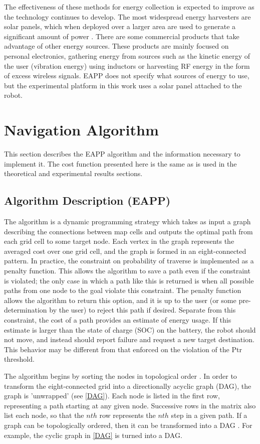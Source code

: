 \documentclass[journal]{IEEEtran}
\newcounter{row}
\newcounter{col}
\begin{document}
The effectiveness of these methods for energy collection is expected to improve as the technology continues to develop. 
The most widespread energy harvesters are solar panels, which when deployed over a larger area are used to generate a significant amount of power \cite{DoE citation here}. 
There are some commercial products that take advantage of other energy sources. 
These products are mainly focused on personal electronics, gathering energy from sources such as the kinetic energy of the user (vibration energy) using inductors or harvesting RF energy in the form of excess wireless signals. 
EAPP does not specify what sources of energy to use, but the experimental platform in this work uses a solar panel attached to the robot.

\section{Navigation Algorithm}
This section describes the EAPP algorithm and the information necessary to implement it. The cost function presented here is the same as is used in the theoretical and experimental results sections.

\subsection{Algorithm Description (EAPP)}
The algorithm is a dynamic programming strategy which takes as input a graph describing the connections between map cells and outputs the optimal path from each grid cell to some target node. 
Each vertex in the graph represents the averaged cost over one grid cell, and the graph is formed in an eight-connected pattern. 
In practice, the constraint on probability of traverse is implemented as a penalty function. 
This allows the algorithm to save a path even if the constraint is violated; the only case in which a path like this is returned is when all possible paths from one node to the goal violate this constraint. 
The penalty function allows the algorithm to return this option, and it is up to the user (or some pre-determination by the user) to reject this path if desired. 
Separate from this constraint, the cost of a path provides an estimate of energy usage. 
If this estimate is larger than the state of charge (SOC) on the battery, the robot should not move, and instead should report failure and request a new target destination. 
This behavior may be different from that enforced on the violation of the Ptr threshold.

The algorithm begins by sorting the nodes in topological order . 
In order to transform the eight-connected grid into a directionally acyclic graph (DAG), the graph is 'unwrapped' (see \ref{DAG}).
Each node is listed in the first row, representing a path starting at any given node. 
Successive rows in the matrix also list each node, so that the $nth$ row represents the $nth$ step in a given path. 
If a graph can be topologically ordered, then it can be transformed into a DAG \cite{vazirani algorithms ch. 6}. For example, the cyclic graph in \ref{DAG} is turned into a DAG.
\end{document}
